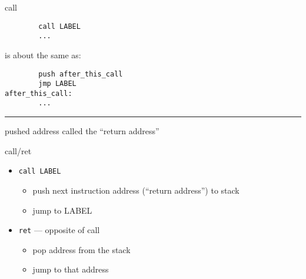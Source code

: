 \begin{frame}[fragile,label=callExpand]{call}
\lstset{language=myasm}
\begin{lstlisting}
        call LABEL
        ...
\end{lstlisting}
{\large is about the same as:}
\begin{lstlisting}
        push after_this_call
        jmp LABEL
after_this_call:
        ...
\end{lstlisting}
\hrule
\large pushed address called the ``return address''
\end{frame}

\begin{frame}[fragile,label=retExpand]{call/ret}
\begin{itemize}
\item \texttt{call LABEL} 
    \begin{itemize}
    \item push next instruction address (``return address'') to stack
    \item jump to LABEL
    \end{itemize}
\item \texttt{ret} --- opposite of call
    \begin{itemize}
    \item pop address from the stack
    \item jump to that address
    \end{itemize}
\end{itemize}
\end{frame}
